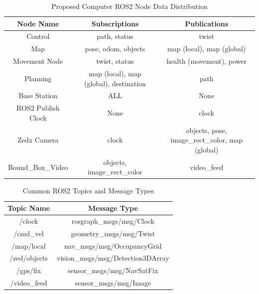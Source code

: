 
\begin{table}[H]
    \centering
    \begin{tabular}{|c|c|c|}
        \hline
        \textbf{Node Name} & \textbf{Subscriptions} & \textbf{Publications} \\
        \hline
        Control & path, status & twist \\
        Map & pose, odom, objects\footnotemark & map (local), map (global) \\
        Movement Node & twist, status & health (movement), power \\
        Planning & map (local), map (global), destination & path \\
        Base Station & ALL & None \\
        ROS2 Publish Clock & None & clock \\
        Zedx Camera & clock & objects, pose, image\_rect\_color, map (global) \\
        Bound\_Box\_Video & objects, image\_rect\_color & video\_feed \\
        \hline
    \end{tabular}
    \caption{Proposed Computer ROS2 Node Data Distribution}
    \label{tab:proposed-ros2-nodes}
\end{table}

\begin{table}[H]
    \centering
    \begin{tabular}{|c|c|}
        \hline
        \textbf{Topic Name} & \textbf{Message Type} \\
        \hline
        /clock & rosgraph\_msgs/msg/Clock \\
        /cmd\_vel & geometry\_msgs/msg/Twist \\
        /map/local & nav\_msgs/msg/OccupancyGrid \\
        /zed/objects & vision\_msgs/msg/Detection3DArray \\
        /gps/fix & sensor\_msgs/msg/NavSatFix \\
        /video\_feed & sensor\_msgs/msg/Image \\
        \hline
    \end{tabular}
    \caption{Common ROS2 Topics and Message Types}
    \label{tab:ros2-topics}
\end{table}

